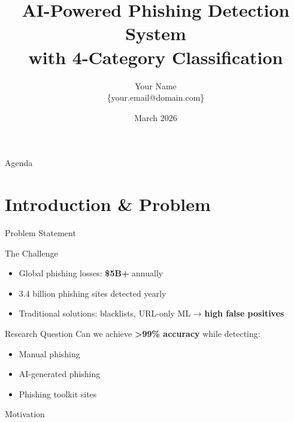 \documentclass[10pt, aspectratio=169]{beamer}
\title{AI-Powered Phishing Detection System \\ with 4-Category Classification}
\author{Your Name \\ \small{\{your.email@domain.com\}}}
\date{March 2026}
\institute{Your College/University}
\begin{document}
\begin{frame}[plain]
    \titlepage
\end{frame}

\begin{frame}{Agenda}
    \tableofcontents
\end{frame}

\section{Introduction \& Problem}

\begin{frame}{Problem Statement}
    \begin{block}{The Challenge}
        \begin{itemize}
            \item Global phishing losses: \textbf{\$5B+} annually
            \item 3.4 billion phishing sites detected yearly
            \item Traditional solutions: blacklists, URL-only ML → \textbf{high false positives}
        \end{itemize}
    \end{block}
    
    \begin{block}{Research Question}
        Can we achieve \textbf{>99\% accuracy} while detecting:
        \begin{itemize}
            \item Manual phishing
            \item AI-generated phishing
            \item Phishing toolkit sites
        \end{itemize}
    \end{block}
\end{frame}

\begin{frame}{Motivation}
    \begin{figure}
        \centering
    \end{figure}
\end{frame}
\end{document}
